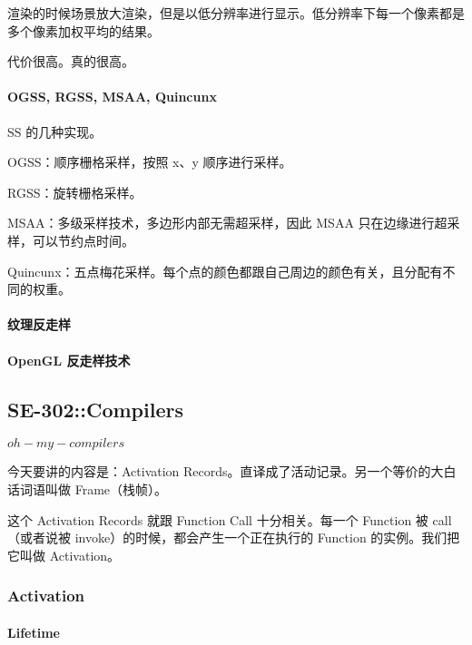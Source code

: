 \documentclass[
]{article}
\begin{document}
渲染的时候场景放大渲染，但是以低分辨率进行显示。低分辨率下每一个像素都是多个像素加权平均的结果。

代价很高。真的很高。

\hypertarget{header-n163}{%
\paragraph{OGSS, RGSS, MSAA, Quincunx}\label{header-n163}}

SS 的几种实现。

OGSS：顺序栅格采样，按照 x、y 顺序进行采样。

RGSS：旋转栅格采样。

MSAA：多级采样技术，多边形内部无需超采样，因此 MSAA
只在边缘进行超采样，可以节约点时间。

Quincunx：五点梅花采样。每个点的颜色都跟自己周边的颜色有关，且分配有不同的权重。

\hypertarget{header-n169}{%
\paragraph{纹理反走样}\label{header-n169}}

\hypertarget{header-n170}{%
\paragraph{OpenGL 反走样技术}\label{header-n170}}

\hypertarget{header-n171}{%
\subsection{SE-302::Compilers}\label{header-n171}}

\(oh-my-compilers\)

今天要讲的内容是：Activation
Records。直译成了活动记录。另一个等价的大白话词语叫做 Frame（栈帧）。

这个 Activation Records 就跟 Function Call 十分相关。每一个 Function 被
call （或者说被 invoke）的时候，都会产生一个正在执行的 Function
的实例。我们把它叫做 Activation。

\hypertarget{header-n175}{%
\subsubsection{Activation}\label{header-n175}}

\hypertarget{header-n176}{%
\paragraph{Lifetime}\label{header-n176}}
\end{document}
